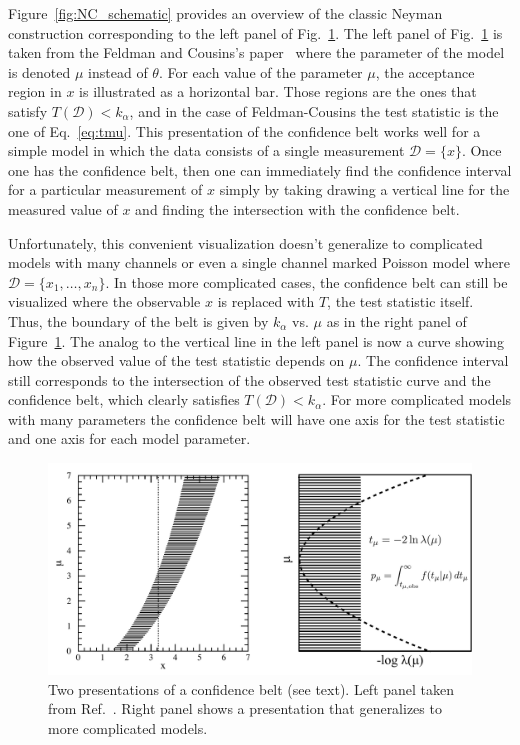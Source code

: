 \documentclass{cernrep}
\newcommand{\data}{{\ensuremath{\mathcal{D}}}}
\begin{document}
Figure~\ref{fig:NC_schematic} provides an overview of the classic Neyman construction corresponding to the left panel of Fig.~\ref{fig:neyman}.  The left panel of  Fig.~\ref{fig:neyman} is taken from the Feldman and Cousins's paper~\cite{Feldman:1997qc} where the parameter of the model is denoted $\mu$ instead of $\theta$.  For each value of the parameter $\mu$, the acceptance region in $x$ is illustrated as a horizontal bar.  Those regions are the ones that satisfy $T(\data)<k_\alpha$, and in the case of Feldman-Cousins the test statistic is the one of Eq.~\ref{eq:tmu}.  This presentation of the confidence belt works well for a simple model in which the data consists of a single measurement $\data=\{x\}$.  Once one has the confidence belt, then one can immediately find the confidence interval for a particular measurement of $x$ simply by taking drawing a vertical line for the measured value of $x$ and finding the intersection with the confidence belt.

Unfortunately, this convenient visualization doesn't generalize to complicated models with many channels or even a single channel marked Poisson model where $\data=\{x_1,\dots,x_n\}$.  In those more complicated cases, the confidence belt can still be visualized where the observable $x$ is replaced with $T$, the test statistic itself.  Thus, the boundary of the belt is given by $k_\alpha$ vs. $\mu$ as in the right panel of Figure~\ref{fig:neyman}. The analog to the vertical line in the left panel is now a curve showing how the observed value of the test statistic depends on $\mu$.  The confidence interval still corresponds to the intersection of the observed test statistic curve and the confidence belt, which clearly satisfies $T(\data)<k_\alpha$.  For more complicated models with many parameters the confidence belt will have one axis for the test statistic and one axis for each model parameter.

\begin{figure}[htbp]
\begin{center}
\includegraphics[width=.9\textwidth]{fc_to_NC_twosided}
\caption{Two presentations of a confidence belt (see text).  Left panel taken from Ref.~\cite{Feldman:1997qc}.  Right panel shows a presentation that generalizes to more complicated models.}
\label{fig:neyman}
\end{center}
\end{figure}
\end{document}
